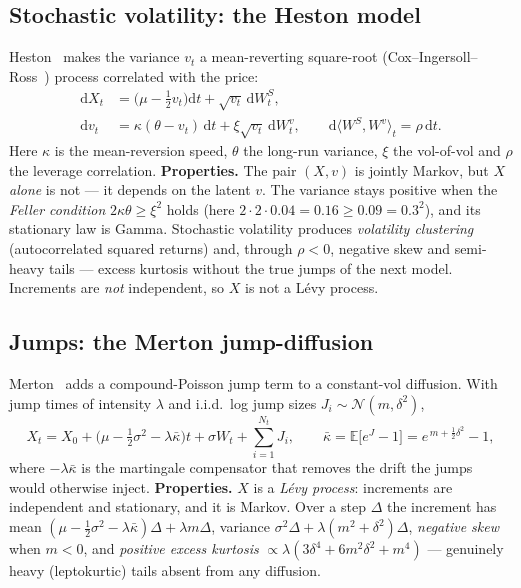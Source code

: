 \documentclass[11pt]{article}
\newcommand{\dd}{\mathrm{d}}
\newcommand{\E}{\mathbb{E}}
\begin{document}
\subsection{Stochastic volatility: the Heston model}
Heston~\cite{Heston1993} makes the variance $v_t$ a mean-reverting square-root
(Cox--Ingersoll--Ross~\cite{CIR1985}) process correlated with the price:
\begin{align}
  \dd X_t &= \Big(\mu - \tfrac12 v_t\Big)\dd t + \sqrt{v_t}\,\dd W_t^{S}, \\
  \dd v_t &= \kappa(\theta - v_t)\,\dd t + \xi\sqrt{v_t}\,\dd W_t^{v},
  \qquad \dd\langle W^{S}, W^{v}\rangle_t = \rho\,\dd t .
\end{align}
Here $\kappa$ is the mean-reversion speed, $\theta$ the long-run variance, $\xi$
the vol-of-vol and $\rho$ the leverage correlation. \textbf{Properties.} The pair
$(X,v)$ is jointly Markov, but $X$ \emph{alone} is not --- it depends on the latent
$v$. The variance stays positive when the \emph{Feller condition}
$2\kappa\theta \ge \xi^2$ holds (here $2\cdot2\cdot0.04 = 0.16 \ge 0.09 = 0.3^2$),
and its stationary law is Gamma. Stochastic volatility produces \emph{volatility
clustering} (autocorrelated squared returns) and, through $\rho<0$, negative
skew and semi-heavy tails --- excess kurtosis without the true jumps of the next
model. Increments are \emph{not} independent, so $X$ is not a L\'evy process.

\subsection{Jumps: the Merton jump-diffusion}
Merton~\cite{Merton1976} adds a compound-Poisson jump term to a constant-vol
diffusion. With jump times of intensity $\lambda$ and i.i.d.\ log jump sizes
$J_i\sim\mathcal{N}(m,\delta^2)$,
\begin{equation}
  X_t = X_0 + \Big(\mu - \tfrac12\sigma^2 - \lambda\bar\kappa\Big)t
        + \sigma W_t + \sum_{i=1}^{N_t} J_i,
  \qquad \bar\kappa = \E\!\big[e^{J}-1\big] = e^{\,m+\frac12\delta^2}-1,
\end{equation}
where $-\lambda\bar\kappa$ is the martingale compensator that removes the drift the
jumps would otherwise inject. \textbf{Properties.} $X$ is a \emph{L\'evy process}:
increments are independent and stationary, and it is Markov. Over a step $\Delta$
the increment has mean $(\mu-\tfrac12\sigma^2-\lambda\bar\kappa)\Delta+\lambda m\Delta$,
variance $\sigma^2\Delta+\lambda(m^2+\delta^2)\Delta$, \emph{negative skew} when
$m<0$, and \emph{positive excess kurtosis} $\propto \lambda(3\delta^4+6m^2\delta^2+m^4)$
--- genuinely heavy (leptokurtic) tails absent from any diffusion.
\end{document}
